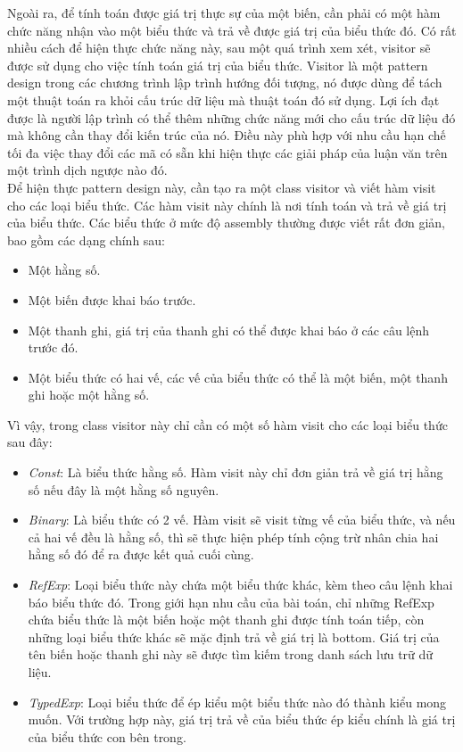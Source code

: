Ngoài ra, để tính toán được giá trị thực sự của một biến, cần phải có một hàm chức năng nhận vào một biểu thức và trả về được giá trị của biểu thức đó. Có rất nhiều cách để hiện thực chức năng này, sau một quá trình xem xét, visitor sẽ được sử dụng cho việc tính toán giá trị của biểu thức. Visitor \cite{dessignpattern} là một pattern design trong các chương trình lập trình hướng đối tượng, nó được dùng để tách một thuật toán ra khỏi cấu trúc dữ liệu mà thuật toán đó sử dụng. Lợi ích đạt được là người lập trình có thể thêm những chức năng mới cho cấu trúc dữ liệu đó mà không cần thay đổi kiến trúc của nó. Điều này phù hợp với nhu cầu hạn chế tối đa việc thay đổi các mã có sẵn khi hiện thực các giải pháp của luận văn trên một trình dịch ngược nào đó.\\

Để hiện thực pattern design này, cần tạo ra một class visitor và viết hàm visit cho các loại biểu thức. Các hàm visit này chính là nơi tính toán và trả về giá trị của biểu thức. Các biểu thức ở mức độ assembly thường được viết rất đơn giản, bao gồm các dạng chính sau:
\begin{itemize}
	\item Một hằng số.
	\item Một biến được khai báo trước.
	\item Một thanh ghi, giá trị của thanh ghi có thể được khai báo ở các câu lệnh trước đó.
	\item Một biểu thức có hai vế, các vế của biểu thức có thể là một biến, một thanh ghi hoặc một hằng số.
\end{itemize}
Vì vậy, trong class visitor này chỉ cần có một số hàm visit cho các loại biểu thức sau đây:

\begin{itemize}
	\item \textit{Const}: Là biểu thức hằng số. Hàm visit này chỉ đơn giản trả về giá trị hằng số nếu đây là một hằng số nguyên.
	\item \textit{Binary}: Là biểu thức có 2 vế. Hàm visit sẽ visit từng vế của biểu thức, và nếu cả hai vế đều là hằng số, thì sẽ thực hiện phép tính cộng trừ nhân chia hai hằng số đó để ra được kết quả cuối cùng.
	\item \textit{RefExp}: Loại biểu thức này chứa một biểu thức khác, kèm theo câu lệnh khai báo biểu thức đó. Trong giới hạn nhu cầu của bài toán, chỉ những RefExp chứa biểu thức là một biến hoặc một thanh ghi được tính toán tiếp, còn những loại biểu thức khác sẽ mặc định trả về giá trị là bottom. Giá trị của tên biến hoặc thanh ghi này sẽ được tìm kiếm trong danh sách lưu trữ dữ liệu.
	\item \textit{TypedExp}: Loại biểu thức để ép kiểu một biểu thức nào đó thành kiểu mong muốn. Với trường hợp này, giá trị trả về của biểu thức ép kiểu chính là giá trị của biểu thức con bên trong.
\end{itemize}

